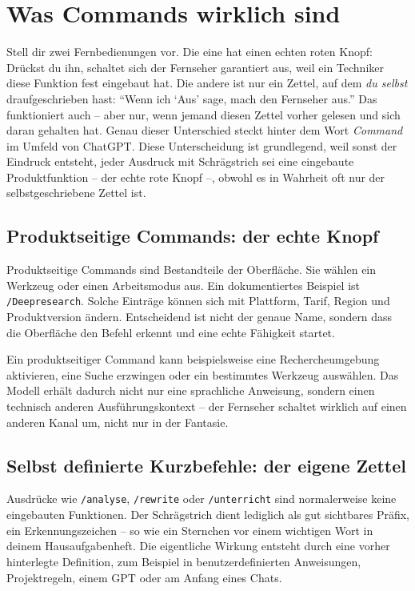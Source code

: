 \chapter{Was Commands wirklich sind}

Stell dir zwei Fernbedienungen vor. Die eine hat einen echten roten Knopf: Drückst du ihn, schaltet sich der Fernseher garantiert aus, weil ein Techniker diese Funktion fest eingebaut hat. Die andere ist nur ein Zettel, auf dem \emph{du selbst} draufgeschrieben hast: ``Wenn ich `Aus' sage, mach den Fernseher aus.'' Das funktioniert auch -- aber nur, wenn jemand diesen Zettel vorher gelesen und sich daran gehalten hat. Genau dieser Unterschied steckt hinter dem Wort \emph{Command} im Umfeld von ChatGPT. Diese Unterscheidung ist grundlegend, weil sonst der Eindruck entsteht, jeder Ausdruck mit Schrägstrich sei eine eingebaute Produktfunktion -- der echte rote Knopf --, obwohl es in Wahrheit oft nur der selbstgeschriebene Zettel ist.



\section{Produktseitige Commands: der echte Knopf}

Produktseitige Commands sind Bestandteile der Oberfläche. Sie wählen ein Werkzeug oder einen Arbeitsmodus aus. Ein dokumentiertes Beispiel ist \texttt{/Deepresearch}. Solche Einträge können sich mit Plattform, Tarif, Region und Produktversion ändern. Entscheidend ist nicht der genaue Name, sondern dass die Oberfläche den Befehl erkennt und eine echte Fähigkeit startet.

Ein produktseitiger Command kann beispielsweise eine Rechercheumgebung aktivieren, eine Suche erzwingen oder ein bestimmtes Werkzeug auswählen. Das Modell erhält dadurch nicht nur eine sprachliche Anweisung, sondern einen technisch anderen Ausführungskontext -- der Fernseher schaltet wirklich auf einen anderen Kanal um, nicht nur in der Fantasie.

\section{Selbst definierte Kurzbefehle: der eigene Zettel}

Ausdrücke wie \texttt{/analyse}, \texttt{/rewrite} oder \texttt{/unterricht} sind normalerweise keine eingebauten Funktionen. Der Schrägstrich dient lediglich als gut sichtbares Präfix, ein Erkennungszeichen -- so wie ein Sternchen vor einem wichtigen Wort in deinem Hausaufgabenheft. Die eigentliche Wirkung entsteht durch eine vorher hinterlegte Definition, zum Beispiel in benutzerdefinierten Anweisungen, Projektregeln, einem GPT oder am Anfang eines Chats.


